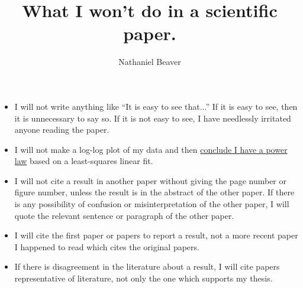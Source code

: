 \documentclass[12pt,letterpaper]{article}
\author{Nathaniel Beaver}
\title{What I won't do in a scientific paper.}
\begin{document}
\maketitle

\begin{itemize}
\item I will not write anything like ``It is easy to see that...'' If it is easy to see, then it is unnecessary to say so. If it is not easy to see, I have needlessly irritated anyone reading the paper.
\item I will not make a log-log plot of my data and then \href{http://vserver1.cscs.lsa.umich.edu/~crshalizi/notebooks/power-laws.html}{conclude I have a power law} based on a least-squares linear fit. 
\item I will not cite a result in another paper without giving the page number or figure number, unless the result is in the abstract of the other paper. If there is any possibility of confusion or misinterpretation of the other paper, I will quote the relevant sentence or paragraph of the other paper.
\item I will cite the first paper or papers to report a result, not a more recent paper I happened to read which cites the original papers.
\item If there is disagreement in the literature about a result, I will cite papers representative of literature, not only the one which supports my thesis.
\end{itemize}
\end{document}
